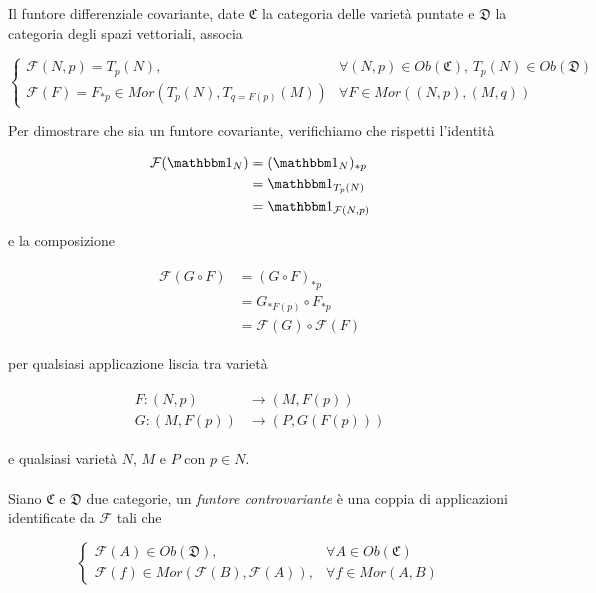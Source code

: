 Il funtore differenziale covariante, date $ \mathfrak{C} $ la categoria delle varietà puntate e $ \mathfrak{D} $ la categoria degli spazi vettoriali, associa

\begin{equation}
	\begin{cases}
		\mathcal{F}(N,p) = T_{p}(N), & \forall (N,p) \in Ob(\mathfrak{C}), \, T_{p}(N) \in Ob(\mathfrak{D})\\
		\mathcal{F}(F) = F_{*p} \in Mor(T_{p}(N),T_{q=F(p)}(M)) & \forall F \in Mor((N,p),(M,q))
	\end{cases}
\end{equation}

Per dimostrare che sia un funtore covariante, verifichiamo che rispetti l'identità

\begin{align}
	\begin{split}
		\mathcal{F}(\bigone_{N}) &= (\bigone_{N})_{*p}\\
		&= \bigone_{T_{p}(N)}\\
		&= \bigone_{\mathcal{F}(N,p)}
	\end{split}
\end{align}

e la composizione

\begin{align}
	\begin{split}
		\mathcal{F}(G \circ F) &= (G \circ F)_{*p}\\
		&= G_{*F(p)} \circ F_{*p}\\
		&= \mathcal{F}(G) \circ \mathcal{F}(F)
	\end{split}
\end{align}

per qualsiasi applicazione liscia tra varietà

\begin{align}
	\begin{split}
		F : (N,p) &\to (M,F(p))\\
		G : (M,F(p)) &\to (P,G(F(p)))
	\end{split}
\end{align}

e qualsiasi varietà $ N $, $ M $ e $ P $ con $ p \in N $.\\\\
%
Siano $ \mathfrak{C} $ e $ \mathfrak{D} $ due categorie, un \textit{funtore controvariante} è una coppia di applicazioni identificate da $ \mathcal{F} $ tali che

\begin{equation}
	\begin{cases}
		\mathcal{F}(A) \in Ob(\mathfrak{D}), & \forall A \in Ob(\mathfrak{C})\\
		\mathcal{F}(f) \in Mor(\mathcal{F}(B),\mathcal{F}(A)), & \forall f \in Mor(A,B)
	\end{cases}
\end{equation}

